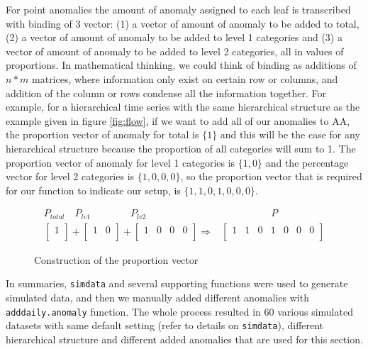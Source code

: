 \newpara

For point anomalies the amount of anomaly assigned to each leaf is transcribed with binding of 3 vector: (1) a vector of amount of anomaly to be added to total,  (2) a vector of amount of anomaly to be added to level 1 categories and (3) a vector of amount of anomaly to be added to level 2 categories, all in values of proportions. In mathematical thinking, we could think of binding as additions of $n*m$ matrices, where information only exist on certain row or columns, and addition of the column or rows condense all the information together.  For example, for a hierarchical time series with the same hierarchical structure as the example given in figure \ref{fig:flow}, if we want to add all of our anomalies to AA, the proportion vector of anomaly for total is $\{1\}$ and this will be the case for any hierarchical structure because the proportion of all categories will sum to 1. The proportion vector of anomaly for level 1 categories is $\{1,0\}$ and the percentage vector for level 2 categories is $\{1,0,0,0\}$, so the proportion vector that is required for our function to indicate our setup, is $\{1,1,0,1,0,0,0\}$. 

\begin{figure}[!h]
	\begin{equation*}
	\begin{aligned}
	P_{total} \quad 
	P_{lv1} \quad \quad \quad \quad  
	P_{lv2} \quad \quad \quad & 
	\quad \quad \quad  \quad \quad  P \\
	\begin{bmatrix}
	1 \\
	\end{bmatrix}
	+
	\begin{bmatrix}
	1 & 0\\
	\end{bmatrix}
	+
	\begin{bmatrix}
	1 & 0 & 0 & 0\\
	\end{bmatrix}
	\Rightarrow &
	\begin{bmatrix}
	1 & 1 & 0 & 1 & 0 & 0 & 0\\
	\end{bmatrix}
	\end{aligned}
	\end{equation*}
	\caption{Construction of the proportion vector}
	\label{fig:vec}
\end{figure}

In summaries, \texttt{simdata} and several supporting functions were used to generate simulated data, and then we manually added different anomalies with \texttt{adddaily.anomaly} function. The whole process resulted in 60 various simulated datasets with same default setting (refer to details on \texttt{simdata}), different hierarchical structure and different added anomalies that are used for this section. 

